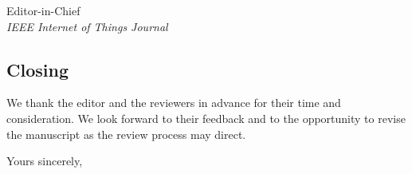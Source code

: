 \documentclass[11pt,a4paper]{letter}
\begin{document}
\begin{letter}{%
    Editor-in-Chief\\
    \emph{IEEE Internet of Things Journal}%
}
\subsection*{Closing}

We thank the editor and the reviewers in advance for their time and consideration. We look forward to their feedback and to the opportunity to revise the manuscript as the review process may direct.

\closing{Yours sincerely,}

\end{letter}
\end{document}
